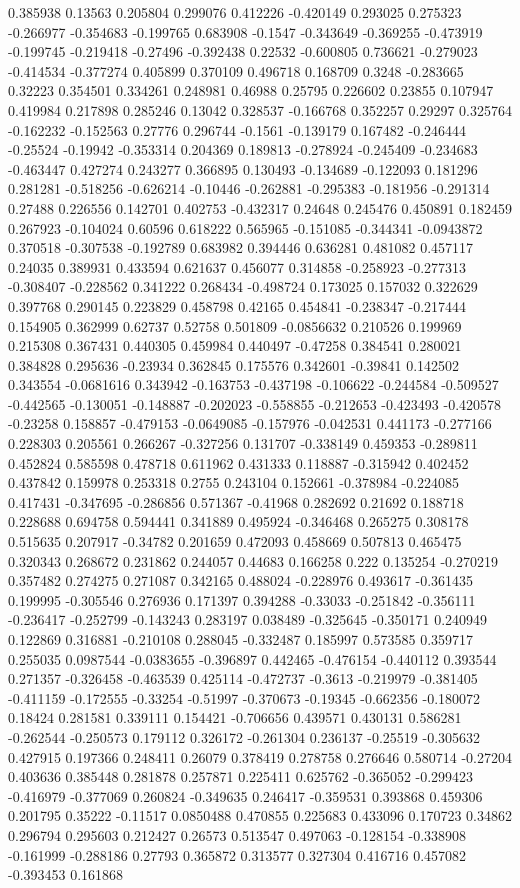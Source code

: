 0.385938 0.13563 0.205804 0.299076 0.412226 -0.420149 0.293025 0.275323 -0.266977 -0.354683 -0.199765 0.683908 -0.1547 -0.343649 -0.369255 -0.473919 -0.199745 -0.219418 -0.27496 -0.392438 0.22532 -0.600805 0.736621 -0.279023 -0.414534 -0.377274 0.405899 0.370109 0.496718 0.168709 0.3248 -0.283665 0.32223 0.354501 0.334261 0.248981 0.46988 0.25795 0.226602 0.23855 0.107947 0.419984 0.217898 0.285246 0.13042 0.328537 -0.166768 0.352257 0.29297 0.325764 -0.162232 -0.152563 0.27776 0.296744 -0.1561 -0.139179 0.167482 -0.246444 -0.25524 -0.19942 -0.353314 0.204369 0.189813 -0.278924 -0.245409 -0.234683 -0.463447 0.427274 0.243277 0.366895 0.130493 -0.134689 -0.122093 0.181296 0.281281 -0.518256 -0.626214 -0.10446 -0.262881 -0.295383 -0.181956 -0.291314 0.27488 0.226556 0.142701 0.402753 -0.432317 0.24648 0.245476 0.450891 0.182459 0.267923 -0.104024 0.60596 0.618222 0.565965 -0.151085 -0.344341 -0.0943872 0.370518 -0.307538 -0.192789 0.683982 0.394446 0.636281 0.481082 0.457117 0.24035 0.389931 0.433594 0.621637 0.456077 0.314858 -0.258923 -0.277313 -0.308407 -0.228562 0.341222 0.268434 -0.498724 0.173025 0.157032 0.322629 0.397768 0.290145 0.223829 0.458798 0.42165 0.454841 -0.238347 -0.217444 0.154905 0.362999 0.62737 0.52758 0.501809 -0.0856632 0.210526 0.199969 0.215308 0.367431 0.440305 0.459984 0.440497 -0.47258 0.384541 0.280021 0.384828 0.295636 -0.23934 0.362845 0.175576 0.342601 -0.39841 0.142502 0.343554 -0.0681616 0.343942 -0.163753 -0.437198 -0.106622 -0.244584 -0.509527 -0.442565 -0.130051 -0.148887 -0.202023 -0.558855 -0.212653 -0.423493 -0.420578 -0.23258 0.158857 -0.479153 -0.0649085 -0.157976 -0.042531 0.441173 -0.277166 0.228303 0.205561 0.266267 -0.327256 0.131707 -0.338149 0.459353 -0.289811 0.452824 0.585598 0.478718 0.611962 0.431333 0.118887 -0.315942 0.402452 0.437842 0.159978 0.253318 0.2755 0.243104 0.152661 -0.378984 -0.224085 0.417431 -0.347695 -0.286856 0.571367 -0.41968 0.282692 0.21692 0.188718 0.228688 0.694758 0.594441 0.341889 0.495924 -0.346468 0.265275 0.308178 0.515635 0.207917 -0.34782 0.201659 0.472093 0.458669 0.507813 0.465475 0.320343 0.268672 0.231862 0.244057 0.44683 0.166258 0.222 0.135254 -0.270219 0.357482 0.274275 0.271087 0.342165 0.488024 -0.228976 0.493617 -0.361435 0.199995 -0.305546 0.276936 0.171397 0.394288 -0.33033 -0.251842 -0.356111 -0.236417 -0.252799 -0.143243 0.283197 0.038489 -0.325645 -0.350171 0.240949 0.122869 0.316881 -0.210108 0.288045 -0.332487 0.185997 0.573585 0.359717 0.255035 0.0987544 -0.0383655 -0.396897 0.442465 -0.476154 -0.440112 0.393544 0.271357 -0.326458 -0.463539 0.425114 -0.472737 -0.3613 -0.219979 -0.381405 -0.411159 -0.172555 -0.33254 -0.51997 -0.370673 -0.19345 -0.662356 -0.180072 0.18424 0.281581 0.339111 0.154421 -0.706656 0.439571 0.430131 0.586281 -0.262544 -0.250573 0.179112 0.326172 -0.261304 0.236137 -0.25519 -0.305632 0.427915 0.197366 0.248411 0.26079 0.378419 0.278758 0.276646 0.580714 -0.27204 0.403636 0.385448 0.281878 0.257871 0.225411 0.625762 -0.365052 -0.299423 -0.416979 -0.377069 0.260824 -0.349635 0.246417 -0.359531 0.393868 0.459306 0.201795 0.35222 -0.11517 0.0850488 0.470855 0.225683 0.433096 0.170723 0.34862 0.296794 0.295603 0.212427 0.26573 0.513547 0.497063 -0.128154 -0.338908 -0.161999 -0.288186 0.27793 0.365872 0.313577 0.327304 0.416716 0.457082 -0.393453 0.161868 